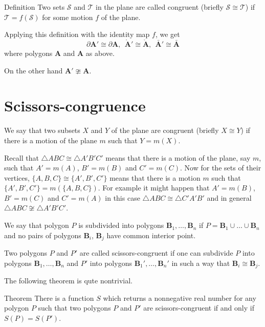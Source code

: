\begin{thm}{Definition}\label{def:cong-sets}
Two sets $\mathcal{S}$ and $\mathcal{T}$ in the plane  
are called congruent 
(briefly $\mathcal{S}\cong \mathcal{T}$)
if 
$\mathcal{T}=f(\mathcal{S})$ for some motion $f$ of the plane.
\end{thm}

Applying this definition with the identity map $f$,
we get 
\[\partial\bm{A}'\cong\partial\bm{A},\ \  
\mathring{\bm{A}}'\cong\mathring{\bm{A}},\ \ 
\bar{\bm{A}}'\cong\bar{\bm{A}}\]
where polygons $\bm{A}$ and $\bm{A}$ as above.

On the other hand $\bm{A}'\ncong\bm{A}$.















\section*{Scissors-congruence}

We say that two subsets $X$ and $Y$ 
of the plane are congruent (briefly $X\cong Y$)
if there is a motion of the plane $m$
such that $Y=m(X)$.

Recall that $\triangle ABC\cong\triangle A'B'C'$ means that there is a motion of the plane, say $m$, 
such that $A'=m(A)$, $B'=m(B)$ and $C'=m(C)$.
Now for the sets of their vertices,
$\{A,B,C\}\cong\{A',B',C'\}$ means that there is a motion $m$ such that $\{A',B',C'\}=m(\{A,B,C\})$.
For example it might happen that $A'=m(B)$, $B'=m(C)$ and $C'=m(A)$
in this case $\triangle ABC\cong\triangle C'A'B'$ and in general $\triangle ABC\not\cong\triangle A'B'C'$.

We say that polygon $P$ is subdivided into polygons $\bm{B}_1,\dots, \bm{B}_n$
if $P=\bm{B}_1\cup\dots\cup \bm{B}_n$ and no pairs of polygons $\bm{B}_i$, $\bm{B}_j$ have common interior point.

Two polygons $P$ and $P'$ are called scissors-congruent
if one can subdivide $P$ into polygons $\bm{B}_1,\dots, \bm{B}_n$
and $P'$ into polygons $\bm{B}_1',\dots, \bm{B}_n'$
in such a way that $\bm{B}_i\cong \bm{B}_j$.



The following theorem is qute nontrivial.

\begin{thm}{Theorem}
There is a function $S$ which returns a nonnegative real number for any polygon $P$ such that two polygons $P$ and $P'$ are scissors-congruent
if and only if $S(P)=S(P')$.
\end{thm}

